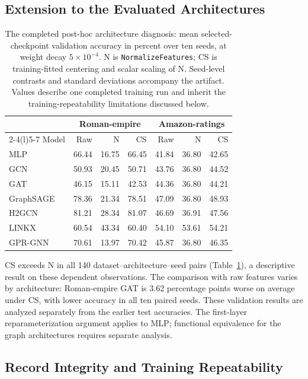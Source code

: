 \subsection{Extension to the Evaluated Architectures}

\begin{table}[ht]
\centering
\caption{The completed post-hoc architecture diagnosis: mean selected-checkpoint validation accuracy in percent over ten seeds, at weight decay $5\times10^{-4}$. N is \texttt{NormalizeFeatures}; CS is training-fitted centering and scalar scaling of N. Seed-level contrasts and standard deviations accompany the artifact. Values describe one completed training run and inherit the training-repeatability limitations discussed below.}
\label{tab:graph_parameterization}
\small
\begin{tabular}{@{}lrrrrrr@{}}
\toprule
& \multicolumn{3}{c}{Roman-empire} & \multicolumn{3}{c}{Amazon-ratings} \\
\cmidrule(lr){2-4}\cmidrule(l){5-7}
Model & Raw & N & CS & Raw & N & CS \\
\midrule
MLP & 66.44 & 16.75 & 66.45 & 41.84 & 36.80 & 42.65 \\
GCN & 50.93 & 20.45 & 50.71 & 43.76 & 36.80 & 44.52 \\
GAT & 46.15 & 15.11 & 42.53 & 44.36 & 36.80 & 44.21 \\
GraphSAGE & 78.36 & 21.34 & 78.51 & 47.09 & 36.80 & 48.93 \\
H2GCN & 81.21 & 28.34 & 81.07 & 46.69 & 36.91 & 47.56 \\
LINKX & 60.54 & 43.34 & 60.40 & 54.10 & 53.61 & 54.21 \\
GPR-GNN & 70.61 & 13.97 & 70.42 & 45.87 & 36.80 & 46.35 \\
\bottomrule
\end{tabular}
\end{table}

CS exceeds N in all 140 dataset--architecture--seed pairs (Table~\ref{tab:graph_parameterization}), a descriptive result on these dependent observations. The comparison with raw features varies by architecture: Roman-empire GAT is 3.62 percentage points worse on average under CS, with lower accuracy in all ten paired seeds. These validation results are analyzed separately from the earlier test accuracies. The first-layer reparameterization argument applies to MLP; functional equivalence for the graph architectures requires separate analysis.

\subsection{Record Integrity and Training Repeatability}
\label{app:training_reproducibility}

